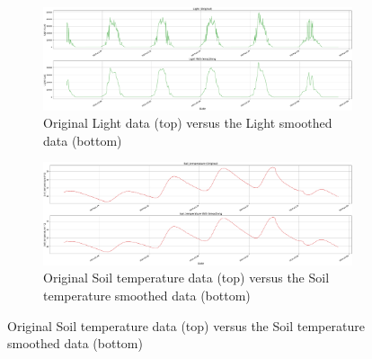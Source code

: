 \begin{figure}[htbp]
    \vspace{1em}  %

    \begin{minipage}[b]{0.45\textwidth}
        \centering
        \begin{subfigure}{\textwidth}
            \centering
            \includegraphics[width=\textwidth]{5_ChapterDesign/figuras/2_Smoothing/Smoothing_Light}
            \caption{Original Light data (top) versus the Light smoothed data (bottom)}
            \label{fig:light}
        \end{subfigure}
    \end{minipage}
    \hfill
    \begin{minipage}[b]{0.45\textwidth}
        \centering
        \begin{subfigure}{\textwidth}
            \centering
            \includegraphics[width=\textwidth]{5_ChapterDesign/figuras/2_Smoothing/Smoothing_Soil_temperature}
            \caption{Original Soil temperature data (top) versus the Soil temperature smoothed data (bottom)}
            \label{fig:soil_temperature}
        \end{subfigure}
    \end{minipage}
    
    \vspace{1em}  %


\end{figure}
